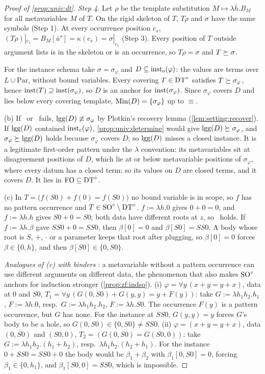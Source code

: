 \begin{proof}[Proof of \cref{prop:univ:dt}]
\emph{Step 4.} Let $\rho$ be the template substitution $M\mapsto\lambda\bar h.B_M$ for all metavariables $M$ of $T$. On the rigid skeleton of $T$, $T\rho$ and $\sigma$ have the same symbols (Step 1). At every occurrence position $c_s$, $(T\rho)|_{c_s}=B_M[\bar u^s]=\kappa(c_s)=\sigma|_{c_s}$ (Step 3). Every position of $T$ outside argument lists is in the skeleton or is an occurrence, so $T\rho=\sigma$ and $T\succeq\sigma$.

For the instance schema take $\sigma=\sigma_\varphi$ and $D\subseteq\mathrm{inst}_{o}(\varphi)$: the values are terms over $L\cup\mathrm{Par}$, without bound variables. Every covering $T\in\mathrm{DT}^{\circ}$ satisfies $T\succeq\sigma_\varphi$, hence $\mathrm{inst}(T)\supseteq\mathrm{inst}(\sigma_\varphi)$, so $D$ is an anchor for $\mathrm{inst}(\sigma_\varphi)$. Since $\sigma_\varphi$ covers $D$ and lies below every covering template, $\mathrm{Min}(D)=\{\sigma_\varphi\}$ up to $\equiv$.

(b) If \evR\ or \evD\ fails, $\mathrm{lgg}(D)\not\equiv\sigma_\varphi$ by Plotkin's recovery lemma (\cref{lem:setting:recover}). If $\mathrm{lgg}(D)$ contained $\mathrm{inst}_{c}(\varphi)$, \cref{prop:univ:determine} would give $\mathrm{lgg}(D)\succeq\sigma_\varphi$, and $\sigma_\varphi\succeq\mathrm{lgg}(D)$ holds because $\sigma_\varphi$ covers $D$; so $\mathrm{lgg}(D)$ misses a closed instance. It is a legitimate first-order pattern under the $\lambda$ convention: its metavariables sit at disagreement positions of $D$, which lie at or below metavariable positions of $\sigma_\varphi$, where every datum has a closed term; so its values on $D$ are closed terms, and it covers $D$. It lies in $\mathrm{FO}\subseteq\mathrm{DT}^{\circ}$.

(c) In $T=\bigl(f(S0)+f(0)=f(S0)\bigr)$ no bound variable is in scope, so $f$ has no pattern occurrence and $T\in\mathrm{SO}^{\circ}\setminus\mathrm{DT}^{\circ}$. $f:=\lambda h.0$ gives $0+0=0$, and $f:=\lambda h.h$ gives $S0+0=S0$; both data have different roots at $z$, so \evR\ holds. If $f:=\lambda h.\beta$ gave $SS0+0=SS0$, then $\beta[0]=0$ and $\beta[S0]=SS0$. A body whose root is $S$, $+$, $\cdot$ or a parameter keeps that root after plugging, so $\beta[0]=0$ forces $\beta\in\{0,h\}$, and then $\beta[S0]\in\{0,S0\}$.

\emph{Analogues of (c) with binders} : a metavariable without a pattern occurrence can use different arguments on different data, the phenomenon that also makes $\mathrm{SO}^{\circ}$ anchors for induction stronger (\cref{prop:zf:indso}). (i) $\varphi=\forall y\,(x+y=y+x)$, data at $0$ and $S0$, $T_1=\forall y\,(G(0,S0)+G(y,y)=y+F(y))$: take $G:=\lambda h_1h_2.h_1$, $F:=\lambda h.0$, resp.\ $G:=\lambda h_1h_2.h_2$, $F:=\lambda h.S0$. The occurrence $F(y)$ is a pattern occurrence, but $G$ has none. For the instance at $SS0$, $G(y,y)=y$ forces $G$'s body to be a hole, so $G(0,S0)\in\{0,S0\}\neq SS0$. (ii) $\varphi=(x+y=y+x)$, data $(0,S0)$ and $(S0,0)$, $T_2=(G(0,S0)=G(S0,0))$: take $G:=\lambda h_1h_2.(h_1+h_2)$, resp.\ $\lambda h_1h_2.(h_2+h_1)$. For the instance $0+SS0=SS0+0$ the body would be $\beta_1+\beta_2$ with $\beta_1[0,S0]=0$, forcing $\beta_1\in\{0,h_1\}$, and $\beta_1[S0,0]=SS0$, which is impossible.
\end{proof}

